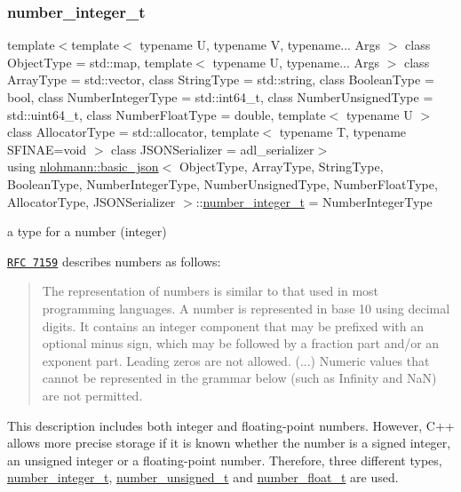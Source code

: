 \subsubsection{\texorpdfstring{number\+\_\+integer\+\_\+t}{number\_integer\_t}}
{\footnotesize\ttfamily template$<$template$<$ typename U, typename V, typename... Args $>$ class Object\+Type = std\+::map, template$<$ typename U, typename... Args $>$ class Array\+Type = std\+::vector, class String\+Type  = std\+::string, class Boolean\+Type  = bool, class Number\+Integer\+Type  = std\+::int64\+\_\+t, class Number\+Unsigned\+Type  = std\+::uint64\+\_\+t, class Number\+Float\+Type  = double, template$<$ typename U $>$ class Allocator\+Type = std\+::allocator, template$<$ typename T, typename S\+F\+I\+N\+A\+E=void $>$ class J\+S\+O\+N\+Serializer = adl\+\_\+serializer$>$ \\
using \mbox{\hyperlink{classnlohmann_1_1basic__json}{nlohmann\+::basic\+\_\+json}}$<$ Object\+Type, Array\+Type, String\+Type, Boolean\+Type, Number\+Integer\+Type, Number\+Unsigned\+Type, Number\+Float\+Type, Allocator\+Type, J\+S\+O\+N\+Serializer $>$\+::\mbox{\hyperlink{classnlohmann_1_1basic__json_a98e611d67b7bd75307de99c9358ab2dc}{number\+\_\+integer\+\_\+t}} =  Number\+Integer\+Type}



a type for a number (integer) 

\href{http://rfc7159.net/rfc7159}{\tt R\+FC 7159} describes numbers as follows\+: \begin{quote}
The representation of numbers is similar to that used in most programming languages. A number is represented in base 10 using decimal digits. It contains an integer component that may be prefixed with an optional minus sign, which may be followed by a fraction part and/or an exponent part. Leading zeros are not allowed. (...) Numeric values that cannot be represented in the grammar below (such as Infinity and NaN) are not permitted. \end{quote}


This description includes both integer and floating-\/point numbers. However, C++ allows more precise storage if it is known whether the number is a signed integer, an unsigned integer or a floating-\/point number. Therefore, three different types, \mbox{\hyperlink{classnlohmann_1_1basic__json_a98e611d67b7bd75307de99c9358ab2dc}{number\+\_\+integer\+\_\+t}}, \mbox{\hyperlink{classnlohmann_1_1basic__json_ab906e29b5d83ac162e823ada2156b989}{number\+\_\+unsigned\+\_\+t}} and \mbox{\hyperlink{classnlohmann_1_1basic__json_a88d6103cb3620410b35200ee8e313d97}{number\+\_\+float\+\_\+t}} are used.

